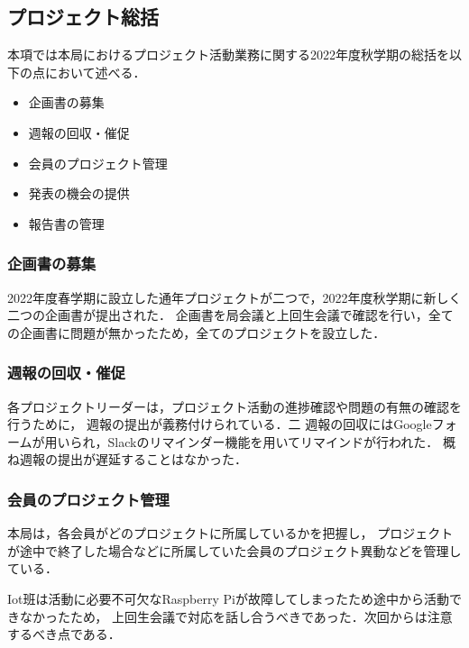 \subsection*{プロジェクト総括}


本項では本局におけるプロジェクト活動業務に関する2022年度秋学期の総括を以下の点において述べる．

\begin{itemize}
  \item 企画書の募集
  \item 週報の回収・催促
  \item 会員のプロジェクト管理
  \item 発表の機会の提供
  \item 報告書の管理
\end{itemize}

\subsubsection*{企画書の募集}

2022年度春学期に設立した通年プロジェクトが二つで，2022年度秋学期に新しく二つの企画書が提出された．
企画書を局会議と上回生会議で確認を行い，全ての企画書に問題が無かったため，全てのプロジェクトを設立した．

\subsubsection*{週報の回収・催促}

各プロジェクトリーダーは，プロジェクト活動の進捗確認や問題の有無の確認を行うために，
週報の提出が義務付けられている．二
週報の回収にはGoogleフォームが用いられ，Slackのリマインダー機能を用いてリマインドが行われた．
概ね週報の提出が遅延することはなかった．

\subsubsection*{会員のプロジェクト管理}

本局は，各会員がどのプロジェクトに所属しているかを把握し，
プロジェクトが途中で終了した場合などに所属していた会員のプロジェクト異動などを管理している．

Iot班は活動に必要不可欠なRaspberry Piが故障してしまったため途中から活動できなかったため，
上回生会議で対応を話し合うべきであった．次回からは注意するべき点である．

